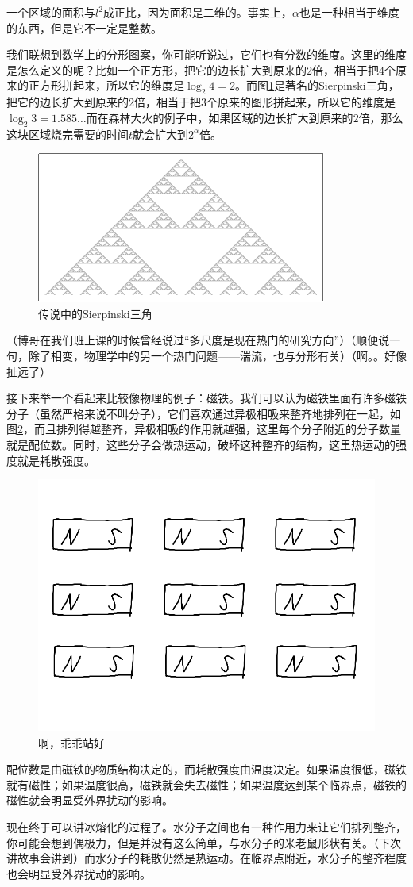 一个区域的面积与$l^2$成正比，因为面积是二维的。事实上，$\alpha$也是一种相当于维度的东西，但是它不一定是整数。

我们联想到数学上的分形图案，你可能听说过，它们也有分数的维度。这里的维度是怎么定义的呢？比如一个正方形，把它的边长扩大到原来的$2$倍，相当于把$4$个原来的正方形拼起来，所以它的维度是$\log_2 4=2$。而图\ref{fig-sierpinski}是著名的Sierpinski三角，把它的边长扩大到原来的$2$倍，相当于把$3$个原来的图形拼起来，所以它的维度是$\log_2 3=1.585 \dots$而在森林大火的例子中，如果区域的边长扩大到原来的$2$倍，那么这块区域烧完需要的时间$t$就会扩大到$2^{\alpha}$倍。
\begin{figure}[htb]
\centering
\includegraphics[width=0.33\linewidth]{fig/sierpinski.png}
\caption{传说中的Sierpinski三角}
\label{fig-sierpinski}
\end{figure}

（博哥在我们班上课的时候曾经说过“多尺度是现在热门的研究方向”）（顺便说一句，除了相变，物理学中的另一个热门问题——湍流，也与分形有关）（啊。。好像扯远了）

接下来举一个看起来比较像物理的例子：磁铁。我们可以认为磁铁里面有许多磁铁分子（虽然严格来说不叫分子），它们喜欢通过异极相吸来整齐地排列在一起，如图\ref{fig-magnet-mole}，而且排列得越整齐，异极相吸的作用就越强，这里每个分子附近的分子数量就是配位数。同时，这些分子会做热运动，破坏这种整齐的结构，这里热运动的强度就是耗散强度。
\begin{figure}[htb]
\centering
\includegraphics[width=0.33\linewidth]{fig/magnet-mole.png}
\caption{啊，乖乖站好}
\label{fig-magnet-mole}
\end{figure}

配位数是由磁铁的物质结构决定的，而耗散强度由温度决定。如果温度很低，磁铁就有磁性；如果温度很高，磁铁就会失去磁性；如果温度达到某个临界点，磁铁的磁性就会明显受外界扰动的影响。

现在终于可以讲冰熔化的过程了。水分子之间也有一种作用力来让它们排列整齐，你可能会想到偶极力，但是并没有这么简单，与水分子的米老鼠形状有关。（下次讲故事会讲到）而水分子的耗散仍然是热运动。在临界点附近，水分子的整齐程度也会明显受外界扰动的影响。

